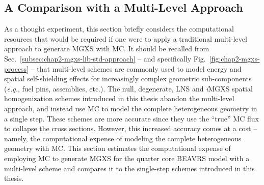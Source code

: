 

\subsection{A Comparison with a Multi-Level Approach}
\label{subsec:chap11-multi-level}

As a thought experiment, this section briefly considers the computational resources that would be required if one were to apply a traditional multi-level approach to generate \ac{MGXS} with \ac{MC}. It should be recalled from Sec.~\ref{subsec:chap2-mgxs-lib-std-approach} -- and specifically Fig.~\ref{fig:chap2-mgxs-process} -- that multi-level schemes are commonly used to model energy and spatial self-shielding effects for increasingly complex geometric sub-components (\textit{e.g.}, fuel pins, assemblies, etc.). The null, degenerate, \ac{LNS} and \textit{i}\ac{MGXS} spatial homogenization schemes introduced in this thesis abandon the multi-level approach, and instead use \ac{MC} to model the complete heterogeneous geometry in a single step. These schemes are more accurate since they use the ``true'' \ac{MC} flux to collapse the cross sections. However, this increased accuracy comes at a cost -- namely, the computational expense of modeling the complete heterogeneous geometry with \ac{MC}. This section estimates the computational expense of employing \ac{MC} to generate \ac{MGXS} for the quarter core \ac{BEAVRS} model with a multi-level scheme and compares it to the single-step schemes introduced in this thesis.

